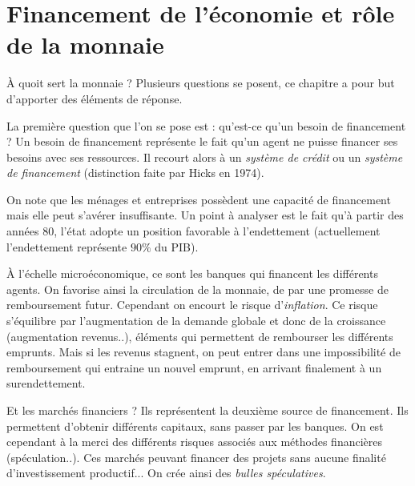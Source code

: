 
\section{Financement de l'économie et rôle de la monnaie} %

\label{prt:financement_de_l_economie_et_role_de_la_monnaie}

À quoit sert la monnaie ? Plusieurs questions se posent, ce chapitre a pour but d'apporter des éléments de réponse. 

La première question que l'on se pose est : qu'est-ce qu'un besoin de financement ? 
Un besoin de financement représente le fait qu'un agent ne puisse financer ses besoins avec ses ressources. Il recourt alors à un \emph{système de crédit} ou un 
\emph{système de financement} (distinction faite par Hicks en 1974).

On note que les ménages et entreprises possèdent une capacité de financement mais elle peut s'avérer insuffisante. Un point à analyser est le fait qu'à partir 
des années 80, l'état adopte un position favorable à l'endettement (actuellement l'endettement représente $90\%$ du PIB).

À l'échelle microéconomique,  ce sont les banques qui financent les différents agents. On favorise ainsi la circulation de la monnaie, de par une promesse de
remboursement futur. Cependant on encourt le risque d'\emph{inflation}. Ce risque s'équilibre par l'augmentation de la demande globale et donc de la croissance 
(augmentation revenus..), éléments qui permettent de rembourser les différents emprunts. Mais si les revenus stagnent, on peut entrer dans une impossibilité de remboursement qui entraine un nouvel emprunt, en arrivant finalement à un surendettement.

Et les marchés financiers ? Ils représentent la deuxième source de financement. Ils permettent d'obtenir différents capitaux, sans passer par les banques. On 
est cependant à la merci des différents risques associés aux méthodes financières (spéculation..). Ces marchés peuvant financer des projets sans aucune finalité d'investissement productif... On crée ainsi des \emph{bulles spéculatives}.

